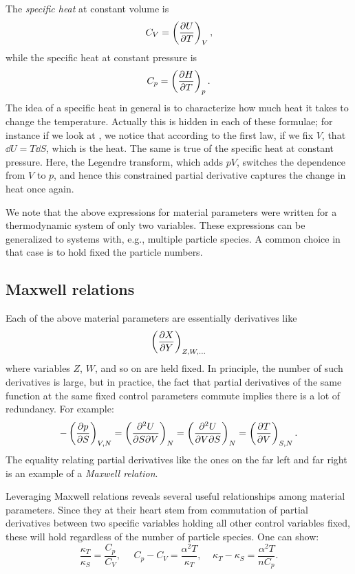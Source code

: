 The {\it specific heat} at constant volume is
\begin{equation}\label{eq:CV}
  C_V=\left(\pdv{U}{T}\right)_{V},
\end{equation}
while the specific heat at constant pressure is
\begin{equation}
  C_p=\left(\pdv{H}{T}\right)_{p}.
\end{equation}
The idea of a specific heat in general is to characterize how much heat
it takes to change the temperature. Actually this is hidden in each of
these formulae; for instance if we look at , we notice
that according to the first law, if we fix $V$, that
$\dd U=T\dd{S}$, which is the heat. The same is true of the specific heat
at constant pressure. Here, the Legendre transform, which adds $pV$,
switches the dependence from $V$ to $p$, and hence this constrained
partial derivative captures the change in heat once again.

We note that the above expressions for material parameters were
written for a thermodynamic system of only two variables. These expressions
can be generalized to systems with, e.g., multiple particle species.
A common choice in that case is to hold fixed the particle numbers.


\subsection{Maxwell relations}

Each of the above material parameters are essentially derivatives like
\begin{equation}
\left(\pdv{X}{Y}\right)_{Z,W,...}
\end{equation}
where variables $Z$, $W$, and so on are held fixed. In principle, the
number of such derivatives is large, but in practice, the fact
that partial derivatives of the same function at the same fixed
control parameters commute implies there is a lot of redundancy. 
For example:
\begin{equation}
-\left(\pdv{p}{S}\right)_{V,N}
=\left(\frac{\partial^2 U}{\partial S\partial V}\right)_{N}
=\left(\frac{\partial^2 U}{\partial V\partial S}\right)_{N}
=\left(\pdv{T}{V}\right)_{S,N}.
\end{equation}
The equality relating partial derivatives like the ones on the far left
and far right is an example of a {\it Maxwell relation}.

Leveraging Maxwell relations reveals several useful relationships
among material parameters. Since they at their heart stem from
commutation of partial derivatives between two specific variables holding
all other control variables fixed, these will hold regardless of
the number of particle species. One can show:
\begin{equation}\label{eq:matparamconstraints}
 \frac{\kappa_T}{\kappa_S}=\frac{C_p}{C_V},~~~~~~ C_p-C_V=\frac{\alpha^2
T}{\kappa_T}, ~~~~~
 \kappa_T-\kappa_S=\frac{\alpha^2 T}{n C_p}.
\end{equation}

